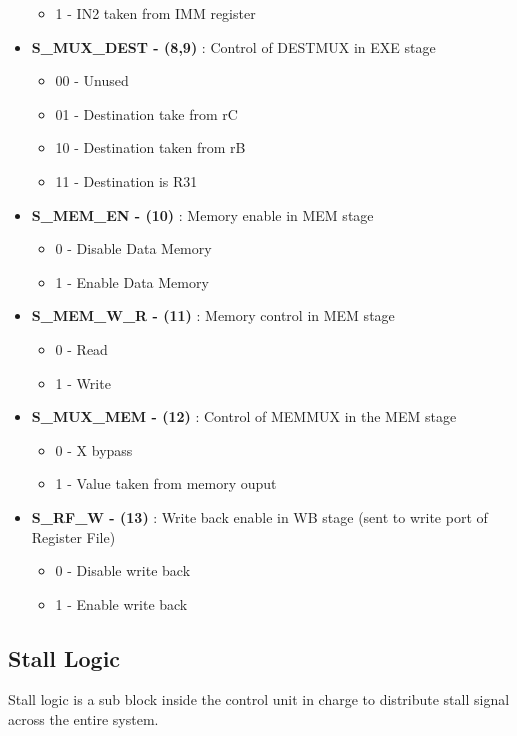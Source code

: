 \documentclass[12pt]{article}
\begin{document}
\begin{itemize}
\begin{itemize}
		\item 1 - IN2 taken from IMM register
	\end{itemize}
	\item \textbf{S\_MUX\_DEST - (8,9)} : Control of DESTMUX in EXE stage
	\begin{itemize}
		\item 00 - Unused 
		\item 01 - Destination take from rC
		\item 10 - Destination taken from rB
		\item 11 - Destination is R31
	\end{itemize}
	\item \textbf{S\_MEM\_EN - (10)} : Memory enable in MEM stage
	\begin{itemize}
		\item 0 - Disable Data Memory 
		\item 1 - Enable Data Memory
	\end{itemize}
		\item \textbf{S\_MEM\_W\_R - (11)} : Memory control in MEM stage
	\begin{itemize}
		\item 0 - Read 
		\item 1 - Write
	\end{itemize}
	\item\textbf{ S\_MUX\_MEM - (12)} : Control of MEMMUX in the MEM stage
	\begin{itemize}
		\item 0 - X bypass
		\item 1 - Value taken from memory ouput
	\end{itemize}
	\item \textbf{S\_RF\_W - (13)} : Write back enable in WB stage (sent to write port of Register File)
	\begin{itemize}
		\item 0 - Disable write back 
		\item 1 - Enable write back
	\end{itemize}
	
\end{itemize}


\subsection{Stall Logic}

Stall logic is a sub block inside the control unit in charge to distribute stall signal across the entire system.
\end{document}
